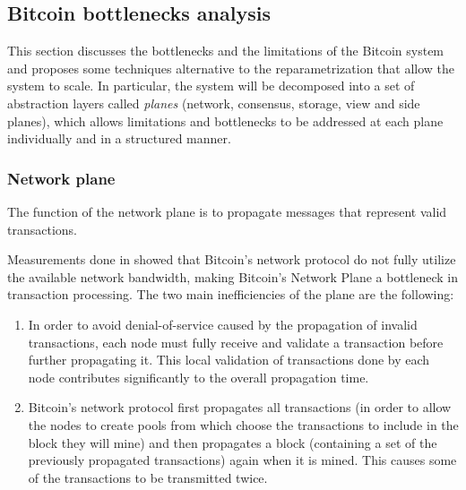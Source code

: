 \subsection{Bitcoin bottlenecks analysis} This section discusses the bottlenecks
and the limitations of the Bitcoin system and proposes some techniques
alternative to the reparametrization that allow the system to scale. In
particular, the system will be decomposed into a set of abstraction layers
called \emph{planes} (network, consensus, storage, view and side planes), which
allows limitations and bottlenecks to be addressed at each plane individually
and in a structured manner.

\subsubsection{Network plane}
The function of the network plane is to propagate messages that represent
valid transactions.

Measurements done in \cite{croman-scaling-blockchain} showed that Bitcoin’s
network protocol do not fully utilize the available network bandwidth,
making Bitcoin’s Network Plane a bottleneck in transaction processing. The two
main inefficiencies of the plane are the following:
\begin{enumerate}
  \item In order to avoid denial-of-service caused by the propagation of invalid
  transactions, each node must fully receive and validate a transaction before
  further propagating it. This local validation of transactions done by each node
  contributes significantly to the overall propagation time.
  \item Bitcoin’s network protocol first propagates all transactions (in order
  to allow the nodes to create pools from which choose the transactions to include
  in the block they will mine) and then propagates a block (containing a set of
  the previously propagated transactions) again when it is mined. This causes
  some of the transactions to be transmitted twice.
\end{enumerate}
